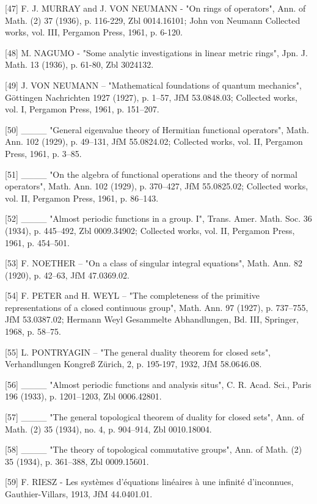 {[}47{]} F. J. MURRAY and J. VON NEUMANN - "On rings of operators", Ann. of Math. (2) 37 (1936), p. 116-229, Zbl 0014.16101; John von Neumann Collected works, vol. III, Pergamon Press, 1961, p. 6-120.

{[}48{]} M. NAGUMO - "Some analytic investigations in linear metric rings", Jpn. J. Math. 13 (1936), p. 61-80, Zbl 3024132.

{[}49{]} J. VON NEUMANN -- "Mathematical foundations of quantum mechanics", Göttingen Nachrichten 1927 (1927), p. 1--57, JfM 53.0848.03; Collected works, vol. I, Pergamon Press, 1961, p. 151--207.

{[}50{]} \_\_\_\_ "General eigenvalue theory of Hermitian functional operators", Math. Ann. 102 (1929), p. 49--131, JfM 55.0824.02; Collected works, vol. II, Pergamon Press, 1961, p. 3--85.

{[}51{]} \_\_\_\_ "On the algebra of functional operations and the theory of normal operators", Math. Ann. 102 (1929), p. 370--427, JfM 55.0825.02; Collected works, vol. II, Pergamon Press, 1961, p. 86--143.

{[}52{]} \_\_\_\_ "Almost periodic functions in a group. I", Trans. Amer. Math. Soc. 36 (1934), p. 445--492, Zbl 0009.34902; Collected works, vol. II, Pergamon Press, 1961, p. 454--501.

{[}53{]} F. NOETHER -- "On a class of singular integral equations", Math. Ann. 82 (1920), p. 42--63, JfM 47.0369.02.

{[}54{]} F. PETER and H. WEYL -- "The completeness of the primitive representations of a closed continuous group", Math. Ann. 97 (1927), p. 737--755, JfM 53.0387.02; Hermann Weyl Gesammelte Abhandlungen, Bd. III, Springer, 1968, p. 58--75.

{[}55{]} L. PONTRYAGIN -- "The general duality theorem for closed sets", Verhandlungen Kongreß Zürich, 2, p. 195-197, 1932, JfM 58.0646.08.

{[}56{]} \_\_\_\_ "Almost periodic functions and analysis situs", C. R. Acad. Sci., Paris 196 (1933), p. 1201--1203, Zbl 0006.42801.

{[}57{]} \_\_\_\_ "The general topological theorem of duality for closed sets", Ann. of Math. (2) 35 (1934), no. 4, p. 904--914, Zbl 0010.18004.

{[}58{]} \_\_\_\_ "The theory of topological commutative groups", Ann. of Math. (2) 35 (1934), p. 361--388, Zbl 0009.15601.

{[}59{]} F. RIESZ - Les systèmes d'équations linéaires à une infinité d'inconnues, Gauthier-Villars, 1913, JfM 44.0401.01.

